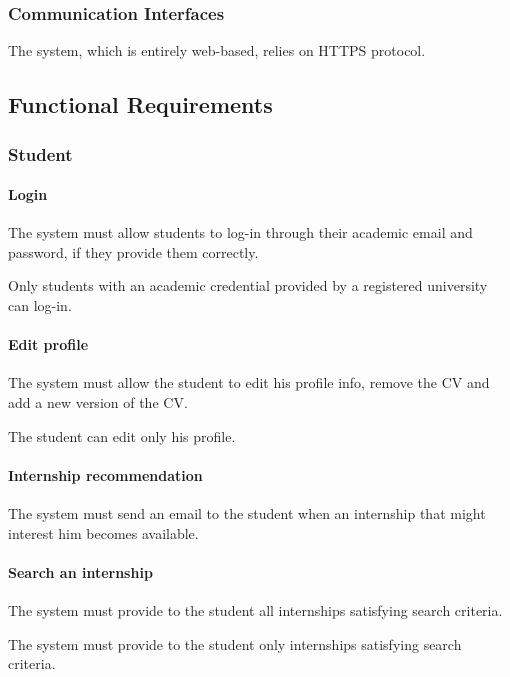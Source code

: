 \subsubsection{Communication Interfaces}
The system, which is entirely web-based, relies on HTTPS protocol.
\subsection{Functional Requirements}
\subsubsection{Student}
\paragraph{Login}
\begin{requirements}
\item The system must allow students to log-in through their academic email and password, if they provide them correctly.
\item Only students with an academic credential provided by a registered university can log-in.
\end{requirements}
\paragraph{Edit profile}
\begin{requirements}[resume]
\item The system must allow the student to edit his profile info, remove the CV and add a new version of the CV.
\item The student can edit only his profile.
\end{requirements}
\paragraph{Internship recommendation}
\begin{requirements}[resume]
\item The system must send an email to the student when an internship that might interest him becomes available.
\end{requirements}
\paragraph{Search an internship}
\begin{requirements}[resume]
\item The system must provide to the student all internships satisfying search criteria.
\item The system must provide to the student only internships satisfying search criteria.
\end{requirements}
